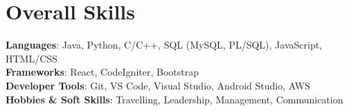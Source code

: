 \documentclass[letterpaper,11pt]{article}
\begin{document}
\section{Overall Skills}
 \begin{itemize}[leftmargin=0.15in, label={}]
    \small{\item{
     \textbf{Languages}{: Java, Python, C/C++, SQL (MySQL, PL/SQL), JavaScript, HTML/CSS} \\
     \textbf{Frameworks}{: React, CodeIgniter, Bootstrap} \\
     \textbf{Developer Tools}{: Git, VS Code, Visual Studio, Android Studio, AWS} \\
     \textbf{Hobbies \& Soft Skills}{: Travelling, Leadership, Management, Communication}\\
    }}
\end{itemize}

 


\end{document}
